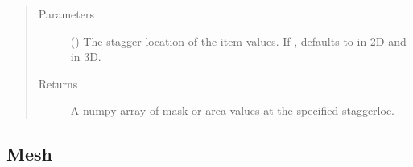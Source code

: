 \documentclass[letterpaper,10pt,english]{sphinxmanual}
\begin{document}
\begin{fulllineitems}
\begin{fulllineitems}
\begin{quote}\begin{description}
\item[{Parameters}] \leavevmode
{} ({\hyperref[\detokenize{StaggerLoc:ESMF.api.constants.StaggerLoc}]{}}) \textendash{} The stagger location of the item
values. If , defaults to
{\hyperref[\detokenize{StaggerLoc:ESMF.api.constants.StaggerLoc.CENTER}]{}} in 2D and
{\hyperref[\detokenize{StaggerLoc:ESMF.api.constants.StaggerLoc.CENTER_VCENTER}]{}} in 3D.

\item[{Returns}] \leavevmode
A numpy array of mask or area values at the specified staggerloc.

\end{description}\end{quote}

\end{fulllineitems}


\end{fulllineitems}



\subsection{Mesh}
\label{\detokenize{mesh:mesh}}\label{\detokenize{mesh::doc}}
\end{document}
